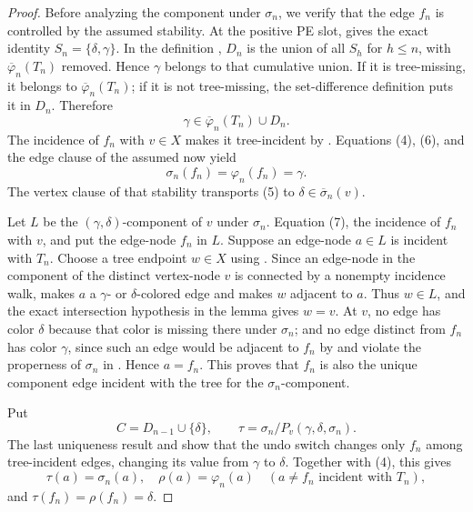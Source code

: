 \begin{proof}
Before analyzing the component under \(\sigma_n\), we verify that the
edge \(f_n\) is controlled by the assumed stability.  At the positive PE
slot,  gives the exact identity
\(S_n=\{\delta,\gamma\}\).  In the definition
, \(D_n\) is the union of all \(S_h\) for
\(h\le n\), with \(\overline\varphi_n(T_n)\) removed.  Hence
\(\gamma\) belongs to that cumulative union.  If it is tree-missing, it
belongs to \(\overline\varphi_n(T_n)\); if it is not tree-missing, the
set-difference definition puts it in \(D_n\).  Therefore
\[
 \gamma\in\overline\varphi_n(T_n)\cup D_n.                      \tag{6}
\]
The incidence of \(f_n\) with \(v\in X\) makes it tree-incident by
.  Equations (4), (6), and the edge clause of
the assumed  now yield
\[
 \sigma_n(f_n)=\varphi_n(f_n)=\gamma.                            \tag{7}
\]
The vertex clause of that stability transports (5) to
\(\delta\in\overline\sigma_n(v)\).

Let \(L\) be the \((\gamma,\delta)\)-component of \(v\) under
\(\sigma_n\).  Equation (7), the incidence of \(f_n\) with \(v\), and
 put the edge-node \(f_n\) in \(L\).
Suppose an edge-node \(a\in L\) is incident with \(T_n\).  Choose a tree
endpoint \(w\in X\) using .  Since an edge-node
in the component of the distinct vertex-node \(v\) is connected by a
nonempty incidence walk,  makes \(a\) a
\(\gamma\)- or \(\delta\)-colored edge and makes \(w\) adjacent to \(a\).
Thus \(w\in L\), and the exact intersection hypothesis in the lemma gives
\(w=v\).  At \(v\), no edge has color \(\delta\) because that color is
missing there under \(\sigma_n\); and no edge distinct from \(f_n\) has
color \(\gamma\), since such an edge would be adjacent to \(f_n\) by
 and violate the properness of \(\sigma_n\) in
.  Hence \(a=f_n\).  This proves that
\(f_n\) is also the unique component edge incident with the tree for the
\(\sigma_n\)-component.

Put
\[
 C=D_{n-1}\cup\{\delta\},\qquad
 \tau=\sigma_n/P_v(\gamma,\delta,\sigma_n).
\]
The last uniqueness result and  show that
the undo switch changes only \(f_n\) among tree-incident edges, changing
its value from \(\gamma\) to \(\delta\).  Together with (4), this gives
\[
 \tau(a)=\sigma_n(a),\quad \rho(a)=\varphi_n(a)
       \quad(a\ne f_n\text{ incident with }T_n),                \tag{8}
\]
and \(\tau(f_n)=\rho(f_n)=\delta\).


\end{proof}
